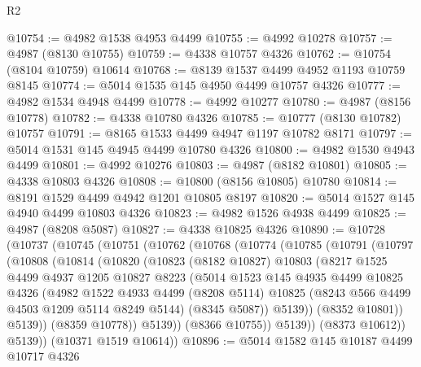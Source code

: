 \begin{lexlean}{R2}
\begin{coremodule}
@10754 := @4982 @1538 @4953 @4499
@10755 := @4992 @10278
@10757 := @4987 (@8130 @10755)
@10759 := @4338 @10757 @4326
@10762 := @10754 (@8104 @10759) @10614
@10768 := @8139 @1537 @4499 @4952 @1193 @10759 @8145
@10774 := @5014 @1535 @145 @4950 @4499 @10757 @4326
@10777 := @4982 @1534 @4948 @4499
@10778 := @4992 @10277
@10780 := @4987 (@8156 @10778)
@10782 := @4338 @10780 @4326
@10785 := @10777 (@8130 @10782) @10757
@10791 := @8165 @1533 @4499 @4947 @1197 @10782 @8171
@10797 := @5014 @1531 @145 @4945 @4499 @10780 @4326
@10800 := @4982 @1530 @4943 @4499
@10801 := @4992 @10276
@10803 := @4987 (@8182 @10801)
@10805 := @4338 @10803 @4326
@10808 := @10800 (@8156 @10805) @10780
@10814 := @8191 @1529 @4499 @4942 @1201 @10805 @8197
@10820 := @5014 @1527 @145 @4940 @4499 @10803 @4326
@10823 := @4982 @1526 @4938 @4499
@10825 := @4987 (@8208 @5087)
@10827 := @4338 @10825 @4326
@10890 := @10728
    (@10737
      (@10745
        (@10751
          (@10762
            (@10768
              (@10774
                (@10785
                  (@10791
                    (@10797
                      (@10808
                        (@10814
                          (@10820
                            (@10823
                              (@8182 @10827)
                              @10803
                              (@8217
                                @1525
                                @4499
                                @4937
                                @1205
                                @10827
                                @8223
                                (@5014
                                  @1523
                                  @145
                                  @4935
                                  @4499
                                  @10825
                                  @4326
                                  (@4982
                                    @1522
                                    @4933
                                    @4499
                                    (@8208 @5114)
                                    @10825
                                    (@8243 @566 @4499 @4503 @1209 @5114 @8249 @5144)
                                    (@8345 @5087))
                                  @5139))
                              (@8352 @10801))
                            @5139))
                        (@8359 @10778))
                      @5139))
                  (@8366 @10755))
                @5139))
            (@8373 @10612))
          @5139))
      (@10371 @1519 @10614))
@10896 := @5014 @1582 @145 @10187 @4499 @10717 @4326

\end{coremodule}
\end{lexlean}
